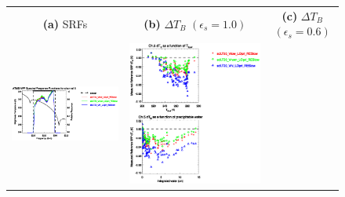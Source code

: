 \begin{figure}[H]
  \centering
  \begin{tabular}{c c c}
    \textsf{\textbf{(a)} SRFs} &
    \textsf{\textbf{(b)} $\Delta T_B$ $(\epsilon_s = 1.0)$} &
    \textsf{\textbf{(c)} $\Delta T_B$ $(\epsilon_s = 0.6)$} \\
    \includegraphics[bb=80 400 280 558,clip,scale=0.85]{graphics/srf/Vset/atms_npp.ch5.osrf.eps} &
    \includegraphics[bb=85 400 260 558,clip,scale=0.85]{graphics/dtb/Vset/e1.0_r0.0/atms_npp.ch5.dTb.eps} & 

\end{tabular}
\end{figure}
